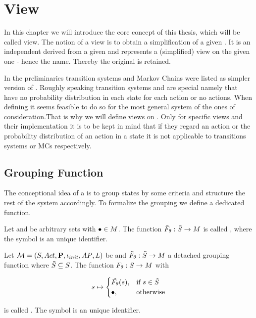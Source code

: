 \documentclass[preview]{standalone}
\begin{document}
	
\section{View}  \label{ch:view}

In this chapter we will introduce the core concept of this thesis, which will be called view. The notion of a view is to obtain a simplification of a given \mdpN. It is an independent \mdpN derived from a given \mdpN and represents a (simplified) view on the given one - hence the name. Thereby the original \mdpN is retained.

In the preliminaries transition systems and Markov Chains were listed as simpler version of \mdpsN. Roughly speaking transition systems and \mdpsN are special \mdpsN namely that have no probability distribution in each state for each action or no actions. When defining \viewsN it seems feasible to do so for the most general system of the ones of consideration.That is why we will define views on \mdpsN. Only for specific views and their implementation it is to be kept in mind that if they regard an action or the probability distribution of an action in a state it is not applicable to transitions systems or MCs respectively.

\subsection{Grouping Function}
The conceptional idea of a \viewN is to group states by some criteria and structure the rest of the system accordingly. To formalize the grouping we define a dedicated function.

\begin{definition}
	Let \smstates and \arbset be arbitrary sets with ${\bullet} \in {M}$. The function ${\tilde{F}_{{\theta}}} : {\tilde{{S}}} \to {\ensuremath{{M}}}$ is called \emph{\grpfctsubN}, where the symbol \viewppty is an unique identifier.
	
	\label{def:grpfctsub}
\end{definition}


\begin{definition}
	Let ${{{\mathcal{M}}}} = {{({S}, {Act}, {\textbf{P}}, {\iota_{init}}, {AP}, {L})}}$ be \achgphN and ${\tilde{F}_{{\theta}}} : {\tilde{{S}}} \to {\ensuremath{{M}}}$ a detached grouping function where ${\tilde{{S}}} \subseteq {S}$. The function ${F_{{\theta}}} : {S} \to {\ensuremath{{M}}}$ with	
	
	\[
	\state \mapsto
	\begin{cases}
		\tilde\grpfct(s),				& \text{if } \state \in \smstates \\ 		\remelem,          	& \text{otherwise}
	\end{cases}
	\]
	
	is called \emph{\grpfctN}. The symbol \viewppty is an unique identifier.
	
	\label{def:grpfct}
\end{definition}
\end{document}
